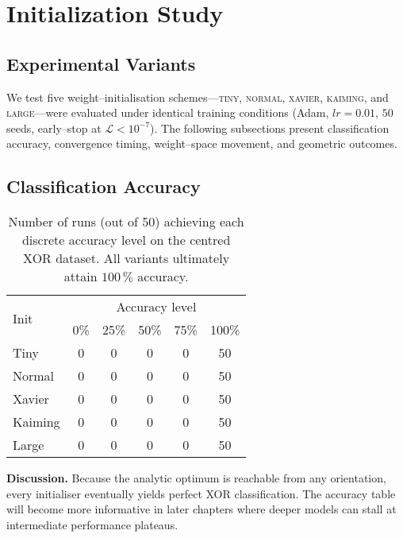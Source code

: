 ﻿%

\section{Initialization Study}
\label{sec:abs1-init}

\subsection*{Experimental Variants}
We test five weight–initialisation schemes—\textsc{tiny}, \textsc{normal},
\textsc{xavier}, \textsc{kaiming}, and \textsc{large}—were evaluated under
identical training conditions (Adam, $lr=0.01$, $50$ seeds, early–stop at
$\mathcal L<10^{-7}$).  The following subsections present classification
accuracy, convergence timing, weight–space movement, and geometric outcomes.

\subsection*{Classification Accuracy}

\begin{table}[h]
\centering
\caption{Number of runs (out of 50) achieving each discrete accuracy level
on the centred XOR dataset.  All variants ultimately attain $100\,\%$
accuracy.}
\label{tab:init-accuracy}
\begin{tabular}{lccccc}
\toprule
\multirow{2}{*}{Init} & \multicolumn{5}{c}{Accuracy level}\\
\cmidrule(lr){2-6}
 & 0\% & 25\% & 50\% & 75\% & 100\% \\
\midrule
Tiny    & 0 & 0 & 0 & 0 & 50 \\
Normal  & 0 & 0 & 0 & 0 & 50 \\
Xavier  & 0 & 0 & 0 & 0 & 50 \\
Kaiming & 0 & 0 & 0 & 0 & 50 \\
Large   & 0 & 0 & 0 & 0 & 50 \\
\bottomrule
\end{tabular}
\end{table}

\textbf{Discussion.}  
Because the analytic optimum is reachable from any orientation, every
initialiser eventually yields perfect XOR classification.  The accuracy table
will become more informative in later chapters where deeper models can stall
at intermediate performance plateaus.

